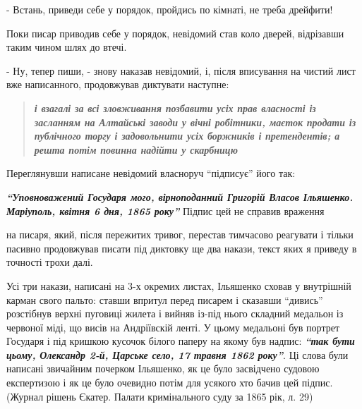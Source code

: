 \documentclass[a4paper,20pt]{report}
\begin{document}
- Встань, приведи себе у порядок, пройдись по кімнаті, не треба дрейфити!

Поки писар приводив себе у порядок, невідомий став коло дверей, відрізавши таким чином шлях до втечі.

- Ну, тепер пиши, - знову наказав невідомий, і, після вписування на чистий лист вже написанного, продовжував
диктувати наступне:

\begin{quote}
\em\bfseries
і взагалі за всі зловживання позбавити усіх прав власності із засланням на Алтайські заводи
у вічні робітники, маєток продати із публічного торгу і задовольнити усіх боржників і претендентів; а решта потім повинна
надійти у скарбницю
\end{quote}

Переглянувши написане невідомий власноруч ``підписує'' його так:

\textbf{\em ``Уповноважений Государя мого, вірноподанний Григорій Власов Ільяшенко. Маріуполь, квітня 6 дня, 1865 року''}
Підпис цей не справив враження

на писаря, який, після пережитих тривог, перестав тимчасово реагувати і тільки
пасивно продовжував писати під диктовку ще два накази, текст яких я приведу в
точності трохи далі.

Усі три накази, написані на 3-х окремих листах, Ільяшенко сховав у внутрішній
карман свого пальто: ставши впритул перед писарем і сказавши ``дивись''
розстібнув верхні пуговиці жилета і вийняв із-під нього складний медальон із
червоної міді, що висів на Андріївскій ленті. У цьому медальоні був портрет
Государя і під кришкою кусочок білого паперу на якому був надпис: \textbf{\em
``так бути цьому, Олександр 2-й, Царське село, 17 травня 1862 року''}.  Ці
слова були написані звичайним почерком Ільяшенко, як це було засвідчено судовою
експертизою і як це було очевидно потім для усякого хто бачив цей підпис.
(Журнал рішень Єкатер. Палати кримінального суду за 1865 рік, л. 29)
\end{document}
